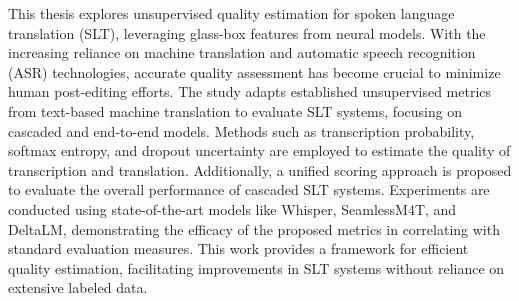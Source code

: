 
\Abstract
This thesis explores unsupervised quality estimation for spoken language translation (SLT), leveraging glass-box features from neural models. With the increasing reliance on machine translation and automatic speech recognition (ASR) technologies, accurate quality assessment has become crucial to minimize human post-editing efforts. The study adapts established unsupervised metrics from text-based machine translation to evaluate SLT systems, focusing on cascaded and end-to-end models. Methods such as transcription probability, softmax entropy, and dropout uncertainty are employed to estimate the quality of transcription and translation. Additionally, a unified scoring approach is proposed to evaluate the overall performance of cascaded SLT systems. Experiments are conducted using state-of-the-art models like Whisper, SeamlessM4T, and DeltaLM, demonstrating the efficacy of the proposed metrics in correlating with standard evaluation measures. This work provides a framework for efficient quality estimation, facilitating improvements in SLT systems without reliance on extensive labeled data.